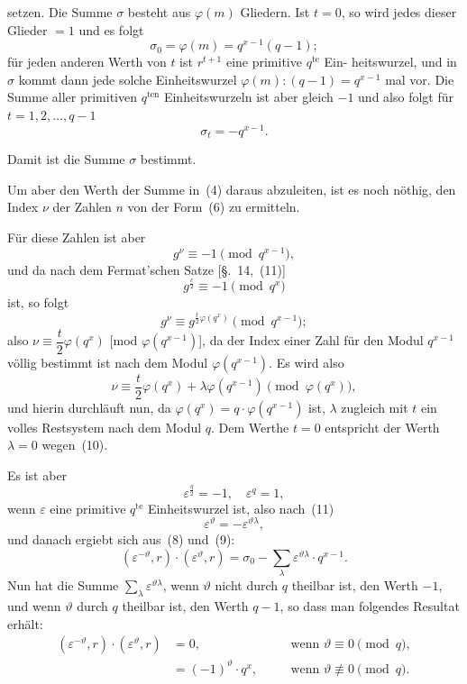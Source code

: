 \documentclass[12pt,a4paper]{article}
\theoremstyle{plain}
\theoremstyle{definition}
\theoremstyle{remark}
\begin{document}
setzen. Die Summe $\sigma$ besteht aus $\varphi(m)$ Gliedern. Ist $t = 0$, so
wird jedes dieser Glieder $= 1$ und es folgt
\begin{equation}\tag{8}
\sigma_0 = \varphi(m) = q^{x-1}(q-1);
\end{equation}
für jeden anderen Werth von $t$ ist $r^{t+1}$ eine primitive $q^{\text{te}}$ Ein-
heitswurzel, und in $\sigma$ kommt dann jede solche Einheitswurzel
$\varphi(m) : (q-1) = q^{x-1}$ mal vor. Die Summe aller primitiven
$q^{\text{ten}}$ Einheitswurzeln ist aber gleich $-1$ und also folgt für
$t = 1, 2, \ldots, q-1$
\begin{equation}\tag{9}
\sigma_t = -q^{x-1}.
\end{equation}

Damit ist die Summe $\sigma$ bestimmt.

Um aber den Werth der Summe in~(4) daraus abzuleiten,
ist es noch nöthig, den Index $\nu$ der Zahlen $n$ von der Form~(6)
zu ermitteln.

Für diese Zahlen ist aber
\[
g^\nu \equiv -1 \pmod{q^{x-1}},
\]
und da nach dem Fermat'schen Satze [\S.~14,~(11)]
\begin{equation}\tag{10}
g^{\frac{c}{2}} \equiv -1 \pmod{q^x}
\end{equation}
ist, so folgt
\[
g^\nu \equiv g^{\frac{t}{2} \varphi(q^x)} \pmod{q^{x-1}};
\]
also $\nu \equiv \dfrac{t}{2} \varphi(q^x)$ [mod $\varphi(q^{x-1})$], da der Index einer Zahl für
den Modul $q^{x-1}$ völlig bestimmt ist nach dem Modul $\varphi(q^{x-1})$.
Es wird also
\begin{equation}\tag{11}
\nu \equiv \frac{t}{2} \varphi(q^x) + \lambda \varphi(q^{x-1}) \pmod{\varphi(q^x)},
\end{equation}
und hierin durchläuft nun, da $\varphi(q^x) = q \cdot \varphi(q^{x-1})$ ist, $\lambda$ zugleich
mit $t$ ein volles Restsystem nach dem Modul $q$. Dem Werthe
$t = 0$ entspricht der Werth $\lambda = 0$ wegen~(10).

Es ist aber
\[
\varepsilon^{\frac{q}{2}} = -1, \quad \varepsilon^q = 1,
\]
wenn $\varepsilon$ eine primitive $q^{\text{te}}$ Einheitswurzel ist, also nach~(11)
\[
\varepsilon^\vartheta = -\varepsilon^{\vartheta \lambda},
\]
und danach ergiebt sich aus~(8) und~(9):
\[
(\varepsilon^{-\vartheta}, r) \cdot (\varepsilon^\vartheta, r) = \sigma_0 - \sum_{\lambda} \varepsilon^{\vartheta \lambda} \cdot q^{x-1}.
\]
Nun hat die Summe $\sum_\lambda \varepsilon^{\vartheta \lambda}$, wenn $\vartheta$ nicht durch $q$ theilbar
ist, den Werth $-1$, und wenn $\vartheta$ durch $q$ theilbar ist, den
Werth $q-1$, so dass man folgendes Resultat erhält:
\begin{equation}\tag{12}
\begin{aligned}
(\varepsilon^{-\vartheta}, r) \cdot (\varepsilon^\vartheta, r) &= 0, &\quad &\text{wenn } \vartheta \equiv 0 \pmod{q}, \\
&= (-1)^\vartheta \cdot q^x, &\quad &\text{wenn } \vartheta \not\equiv 0 \pmod{q}.
\end{aligned}
\end{equation}
\end{document}
